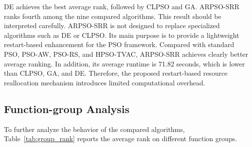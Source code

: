 \documentclass[conference]{IEEEtran}
\begin{document}
\begin{table}[!t]
\caption{Average Rank and Runtime of Compared Algorithms}
\centering
\scriptsize
\setlength{\tabcolsep}{2pt}
\label{tab:rank_runtime}
\end{table}

DE achieves the best average rank, followed by CLPSO and GA. ARPSO-SRR ranks fourth among the nine compared algorithms. This result should be interpreted carefully. ARPSO-SRR is not designed to replace specialized algorithms such as DE or CLPSO. Its main purpose is to provide a lightweight restart-based enhancement for the PSO framework. Compared with standard PSO, PSO-AW, PSO-RS, and HPSO-TVAC, ARPSO-SRR achieves clearly better average ranking. In addition, its average runtime is 71.82 seconds, which is lower than CLPSO, GA, and DE. Therefore, the proposed restart-based resource reallocation mechanism introduces limited computational overhead.

\subsection{Function-group Analysis}
To further analyze the behavior of the compared algorithms, Table~\ref{tab:group_rank} reports the average rank on different function groups.


\begin{table}[!t]
\caption{Average Rank on Different Function Groups}
\centering
\scriptsize
\setlength{\tabcolsep}{2pt}
\label{tab:group_rank}
\end{table}
\end{document}

